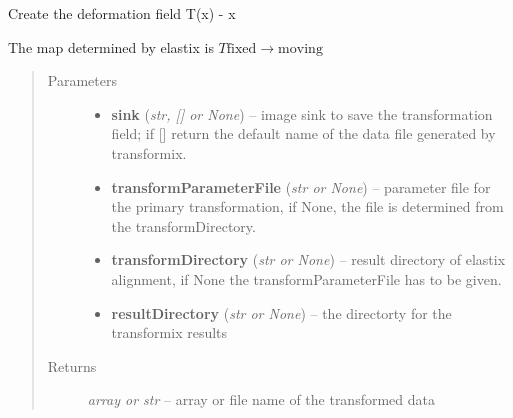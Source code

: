 \documentclass[letterpaper,10pt,english]{sphinxmanual}
\begin{document}
\begin{fulllineitems}
\label{api/ClearMap.Alignment:ClearMap.Alignment.Elastix.deformationField}
Create the deformation field T(x) - x

The map determined by elastix is
$T \mathrm{fixed} \rightarrow \mathrm{moving}$
\begin{quote}\begin{description}
\item[{Parameters}] \leavevmode\begin{itemize}
\item {} 
\textbf{sink} (\emph{str, {[}{]} or None}) --
image sink to save the transformation field; if {[}{]} return the default name of the data file generated by transformix.

\item {} 
\textbf{transformParameterFile} (\emph{str or None}) --
parameter file for the primary transformation, if None, the file is determined from the transformDirectory.

\item {} 
\textbf{transformDirectory} (\emph{str or None}) --
result directory of elastix alignment, if None the transformParameterFile has to be given.

\item {} 
\textbf{resultDirectory} (\emph{str or None}) --
the directorty for the transformix results

\end{itemize}

\item[{Returns}] \leavevmode
\emph{array or str} --
array or file name of the transformed data

\end{description}\end{quote}

\end{fulllineitems}

\end{document}
